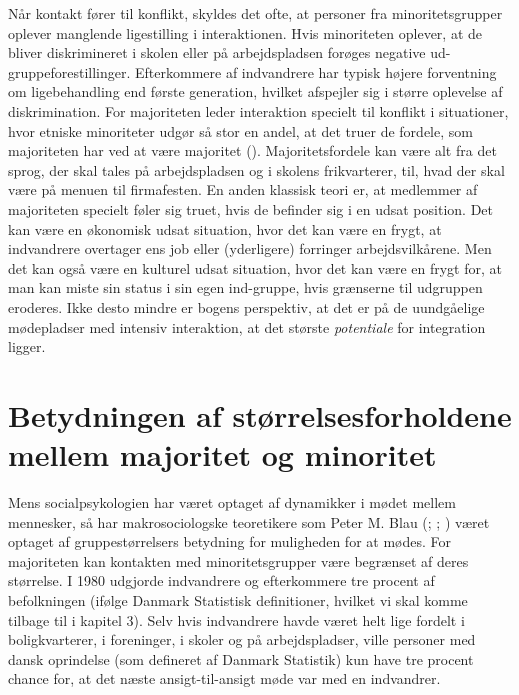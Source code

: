 \documentclass[
]{book}
\begin{document}
Når kontakt fører til konflikt, skyldes det ofte, at personer fra minoritetsgrupper oplever manglende ligestilling i interaktionen. Hvis minoriteten oplever, at de bliver diskrimineret i skolen eller på arbejdspladsen forøges negative ud-gruppeforestillinger. Efterkommere af indvandrere har typisk højere forventning om ligebehandling end første generation, hvilket afspejler sig i større oplevelse af diskrimination. For majoriteten leder interaktion specielt til konflikt i situationer, hvor etniske minoriteter udgør så stor en andel, at det truer de fordele, som majoriteten har ved at være majoritet (). Majoritetsfordele kan være alt fra det sprog, der skal tales på arbejdspladsen og i skolens frikvarterer, til, hvad der skal være på menuen til firmafesten. En anden klassisk teori er, at medlemmer af majoriteten specielt føler sig truet, hvis de befinder sig i en udsat position. Det kan være en økonomisk udsat situation, hvor det kan være en frygt, at indvandrere overtager ens job eller (yderligere) forringer arbejdsvilkårene. Men det kan også være en kulturel udsat situation, hvor det kan være en frygt for, at man kan miste sin status i sin egen ind-gruppe, hvis grænserne til udgruppen eroderes. Ikke desto mindre er bogens perspektiv, at det er på de uundgåelige mødepladser med intensiv interaktion, at det største \emph{potentiale} for integration ligger.

\section{Betydningen af størrelsesforholdene mellem majoritet og minoritet}\label{betydningen-af-stuxf8rrelsesforholdene-mellem-majoritet-og-minoritet}

Mens socialpsykologien har været optaget af dynamikker i mødet mellem mennesker, så har makrosociologske teoretikere som Peter M. Blau (; ; ) været optaget af gruppestørrelsers betydning for muligheden for at mødes. For majoriteten kan kontakten med minoritetsgrupper være begrænset af deres størrelse. I 1980 udgjorde indvandrere og efterkommere tre procent af befolkningen (ifølge Danmark Statistisk definitioner, hvilket vi skal komme tilbage til i kapitel 3). Selv hvis indvandrere havde været helt lige fordelt i boligkvarterer, i foreninger, i skoler og på arbejdspladser, ville personer med dansk oprindelse (som defineret af Danmark Statistik) kun have tre procent chance for, at det næste ansigt-til-ansigt møde var med en indvandrer.
\end{document}
